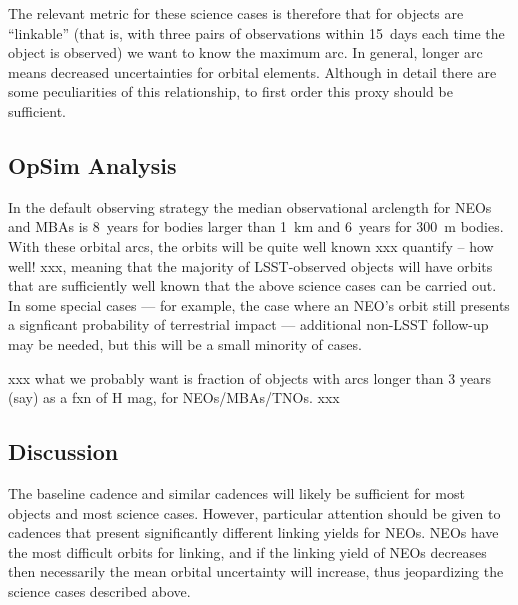The relevant metric for these science cases is therefore
that for objects are ``linkable'' (that is, with three pairs
of observations within 15~days each time the object is
observed) we want to know the maximum arc. In general,
longer arc means decreased uncertainties for orbital
elements. Although in detail there are some peculiarities
of this relationship, to first order this proxy should
be sufficient.


\subsection{OpSim Analysis}
\label{sec:\secname:analysis}



In the default observing strategy the median observational
arclength for NEOs and MBAs is 8~years for bodies
larger than 1~km and 6~years for 300~m bodies. With these
orbital arcs, the orbits will be quite well known
xxx quantify -- how well! xxx, meaning that the majority
of LSST-observed objects will have orbits that are sufficiently
well known that the above science cases can be carried out.
In some special cases --- for example, the case where 
an NEO's orbit still presents a signficant probability 
of terrestrial impact --- additional non-LSST follow-up
may be needed, but this will be a small minority of cases.

xxx what we probably want is fraction of objects
with arcs longer than 3 years (say) as a fxn of 
H mag, for NEOs/MBAs/TNOs. xxx



\subsection{Discussion}
\label{sec:\secname:discussion}

The baseline cadence and similar cadences will likely be
sufficient for most objects and most science cases. However,
particular attention should be given to cadences that present
significantly different linking yields for NEOs. NEOs
have the most difficult orbits for linking, and if the linking
yield of NEOs decreases then necessarily the mean orbital
uncertainty will increase, thus jeopardizing the science
cases described above.

